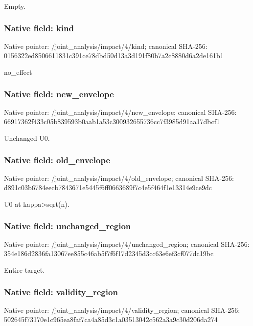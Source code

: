 \documentclass[10pt,a4paper]{article}
\begin{document}
\begingroup\raggedright\sloppy Empty.\par\endgroup

\subsubsection{Native field: kind}
Native pointer: /joint\_\allowbreak{}analysis/impact/4/kind; canonical SHA-256: 0156322ed8506611831c391ce78dbd50d13a3d191f80b7a2c8880d6a2de161b1

\begingroup\raggedright\sloppy no\_\allowbreak{}effect\par\endgroup

\subsubsection{Native field: new\_\allowbreak{}envelope}
Native pointer: /joint\_\allowbreak{}analysis/impact/4/new\_\allowbreak{}envelope; canonical SHA-256: 66917362f433c05b839593b0aab1a53c300932655736cc7f3985d91aa17dbcf1

\begingroup\raggedright\sloppy Unchanged U0.\par\endgroup

\subsubsection{Native field: old\_\allowbreak{}envelope}
Native pointer: /joint\_\allowbreak{}analysis/impact/4/old\_\allowbreak{}envelope; canonical SHA-256: d891c03b6784eecb7843671e5445f6ff0663689f7c4e5f464f1e13314e9ce9dc

\begingroup\raggedright\sloppy U0 at kappa>sqrt(n).\par\endgroup

\subsubsection{Native field: unchanged\_\allowbreak{}region}
Native pointer: /joint\_\allowbreak{}analysis/impact/4/unchanged\_\allowbreak{}region; canonical SHA-256: 354e186d2836fa13067ee855c46ab5f7f6f17d2345d3cc63e6ef3cf077dc19bc

\begingroup\raggedright\sloppy Entire target.\par\endgroup

\subsubsection{Native field: validity\_\allowbreak{}region}
Native pointer: /joint\_\allowbreak{}analysis/impact/4/validity\_\allowbreak{}region; canonical SHA-256: 502645f73170e1c965ea8faf7ca4a85d3c1a03513042c562a3a9c30d206da274
\end{document}
